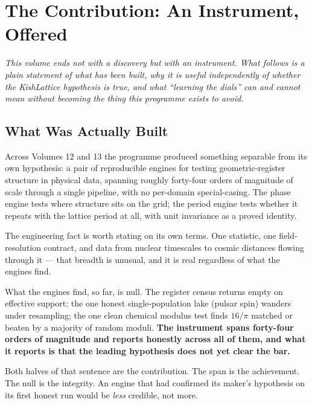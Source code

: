\documentclass[11pt, letterpaper, openany]{book}
\begin{document}
\chapter{The Contribution: An Instrument, Offered}

\begin{center}
\textit{This volume ends not with a discovery but with an instrument. What follows is a plain
statement of what has been built, why it is useful independently of whether the KishLattice
hypothesis is true, and what ``learning the dials'' can and cannot mean without becoming the thing
this programme exists to avoid.}
\end{center}

\section{What Was Actually Built}

Across Volumes 12 and 13 the programme produced something separable from its own hypothesis: a
pair of reproducible engines for testing geometric-register structure in physical data, spanning
roughly forty-four orders of magnitude of scale through a single pipeline, with no per-domain
special-casing. The phase engine tests where structure sits on the grid; the period engine tests
whether it repeats with the lattice period at all, with unit invariance as a proved identity.

The engineering fact is worth stating on its own terms. One statistic, one field-resolution
contract, and data from nuclear timescales to cosmic distances flowing through it --- that breadth
is unusual, and it is real regardless of what the engines find.

\begin{signalbox}
What the engines find, so far, is null. The register census returns empty on effective support;
the one honest single-population lake (pulsar spin) wanders under resampling; the one clean
chemical modulus test finds $16/\pi$ matched or beaten by a majority of random moduli. \textbf{The
instrument spans forty-four orders of magnitude and reports honestly across all of them, and what
it reports is that the leading hypothesis does not yet clear the bar.}

\medskip
\noindent Both halves of that sentence are the contribution. The span is the achievement. The null
is the integrity. An engine that had confirmed its maker's hypothesis on its first honest run would
be \emph{less} credible, not more.
\end{signalbox}
\end{document}
